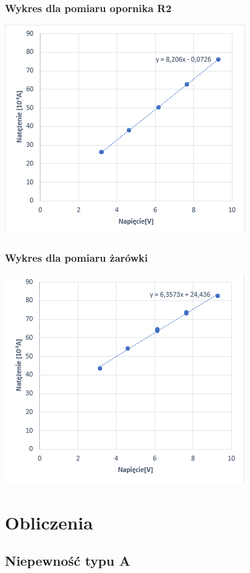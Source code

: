 \documentclass[12pt]{article}
\begin{document}
\subsubsection{Wykres dla pomiaru opornika R2}
\includegraphics{pomiar2.png}

\subsubsection{Wykres dla pomiaru żarówki}
\includegraphics{pomiar3.png}

\section{Obliczenia}
\subsection{Niepewność typu A}
\end{document}

